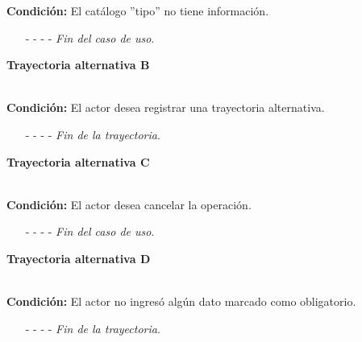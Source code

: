 \noindent \textbf{Condición:} El catálogo ''tipo'' no tiene información.
\begin{enumerate}
	\UCpaso[\UCsist] Muestra el mensaje  en la pantalla  para indicar que no es posible realizar la operación debido a la falta de información necesaria para el sistema.
	\item[- -] - - {\em {Fin del caso de uso}}.%
\end{enumerate}
\hypertarget{CU12-1-1-1:TAB}{\textbf{Trayectoria alternativa B}}\\
\noindent \textbf{Condición:} El actor desea registrar una trayectoria alternativa.
\begin{enumerate}
	\UCpaso[\UCactor] Selecciona la opción ''Alternativa'' del campo ''Tipo''.
	\UCpaso[\UCsist] Muestra el campo de condición.
	\UCpaso[\UCactor] Ingresa la condición de la trayectoria.
	\UCpaso[\UCactor] Selecciona si en la trayectoria se termina el caso de uso.
	\UCpaso Continúa con el paso \ref{CU12.1.1.1-P18} de la trayectoria principal.
	\item[- -] - - {\em {Fin de la trayectoria}}.%
\end{enumerate}
\hypertarget{CU12-1-1-1:TAC}{\textbf{Trayectoria alternativa C}}\\
\noindent \textbf{Condición:} El actor desea cancelar la operación.
\begin{enumerate}
	\UCpaso[\UCactor] Solicita cancelar la operación oprimiendo el botón  de la pantalla .
	\UCpaso[\UCsist] Muestra la pantalla .
	\item[- -] - - {\em {Fin del caso de uso}}.%
\end{enumerate}
\hypertarget{CU12-1-1-1:TAD}{\textbf{Trayectoria alternativa D}}\\
\noindent \textbf{Condición:} El actor no ingresó algún dato marcado como obligatorio.
\begin{enumerate}
	\UCpaso[\UCsist] Muestra el mensaje  señalando el campo que presenta el error en la pantalla .
	\UCpaso Regresa al paso \ref{CU12.1.1.1-P16} de la trayectoria principal.
	\item[- -] - - {\em {Fin de la trayectoria}}.%
\end{enumerate}
